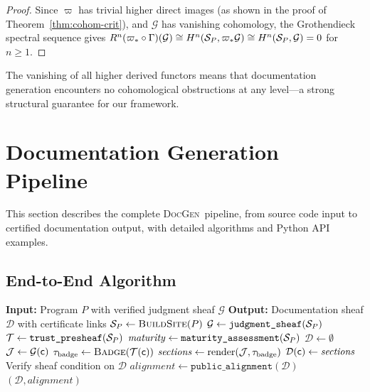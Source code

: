 \documentclass[11pt]{article}
\newcommand{\DocGen}{\textsc{DocGen}}
\newcommand{\DocSheaf}{\mathcal{D}}
\newcommand{\TrustBadge}{\tau_{\mathrm{badge}}}
\newcommand{\RenderFunc}{\mathrm{render}}
\newcommand{\ProjFunc}{\varpi}                        %
\begin{document}
\begin{proof}
Since $\ProjFunc$ has trivial higher direct images (as shown in the
proof of Theorem~\ref{thm:cohom-crit}), and $\mathcal{G}$ has
vanishing cohomology, the Grothendieck spectral sequence gives
$R^n(\ProjFunc_{*} \circ \Gamma)(\mathcal{G}) \cong
\Hcoh{n}(\Site_P, \ProjFunc_{*}\mathcal{G}) \cong
\Hcoh{n}(\Site_P, \mathcal{G}) = 0$ for $n \geq 1$.
\end{proof}

The vanishing of all higher derived functors means that documentation
generation encounters no cohomological obstructions at any level---a
strong structural guarantee for our framework.

\section{Documentation Generation Pipeline}\label{sec:pipeline}

This section describes the complete \DocGen\ pipeline, from source code
input to certified documentation output, with detailed algorithms and
Python API examples.

\subsection{End-to-End Algorithm}

\begin{algorithm}[H]
\caption{Documentation Generation from Judgment Certificates}
\label{alg:docgen}
\begin{algorithmic}[1]
\STATE \textbf{Input:} Program $P$ with verified judgment sheaf
       $\mathcal{G}$
\STATE \textbf{Output:} Documentation sheaf $\DocSheaf$ with
       certificate links
\STATE $\mathcal{S}_P \gets \textsc{BuildSite}(P)$
\STATE $\mathcal{G} \gets \texttt{judgment\_sheaf}(\mathcal{S}_P)$
\STATE $\mathcal{T} \gets \texttt{trust\_presheaf}(\mathcal{S}_P)$
\STATE $\mathit{maturity} \gets \texttt{maturity\_assessment}(\mathcal{S}_P)$
\STATE $\DocSheaf \gets \emptyset$
  \STATE $\mathcal{J} \gets \mathcal{G}(\mathsf{c})$
  \STATE $\TrustBadge \gets \textsc{Badge}(\trust(\coord))$
  \STATE $\mathit{sections} \gets \RenderFunc(\J, \TrustBadge)$
  \STATE $\DocSheaf(\coord) \gets \mathit{sections}$
\ENDFOR
\STATE Verify sheaf condition on $\DocSheaf$
\STATE $\mathit{alignment} \gets \texttt{public\_alignment}(\DocSheaf)$
\RETURN $(\DocSheaf, \mathit{alignment})$
\end{algorithmic}
\end{algorithm}
\end{document}
